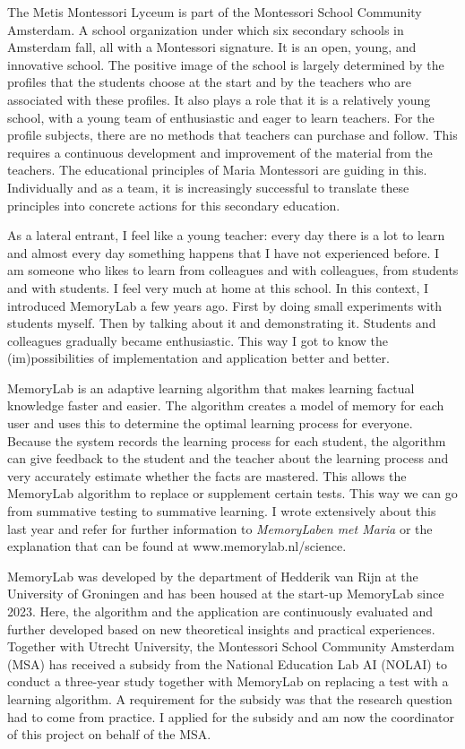 \documentclass[12pt, a4paper]{article}
\begin{document}
The Metis Montessori Lyceum is part of the Montessori School Community Amsterdam. A school organization under which six secondary schools in Amsterdam fall, all with a Montessori signature. It is an open, young, and innovative school. The positive image of the school is largely determined by the profiles that the students choose at the start and by the teachers who are associated with these profiles. It also plays a role that it is a relatively young school, with a young team of enthusiastic and eager to learn teachers. For the profile subjects, there are no methods that teachers can purchase and follow. This requires a continuous development and improvement of the material from the teachers. The educational principles of Maria Montessori are guiding in this. Individually and as a team, it is increasingly successful to translate these principles into concrete actions for this secondary education.

As a lateral entrant, I feel like a young teacher: every day there is a lot to learn and almost every day something happens that I have not experienced before. I am someone who likes to learn from colleagues and with colleagues, from students and with students. I feel very much at home at this school. In this context, I introduced MemoryLab a few years ago. First by doing small experiments with students myself. Then by talking about it and demonstrating it. Students and colleagues gradually became enthusiastic. This way I got to know the (im)possibilities of implementation and application better and better.

MemoryLab is an adaptive learning algorithm that makes learning factual knowledge faster and easier. The algorithm creates a model of memory for each user and uses this to determine the optimal learning process for everyone. Because the system records the learning process for each student, the algorithm can give feedback to the student and the teacher about the learning process and very accurately estimate whether the facts are mastered. This allows the MemoryLab algorithm to replace or supplement certain tests. This way we can go from summative testing to summative learning. I wrote extensively about this last year and refer for further information to \emph{MemoryLaben met Maria} \cite[]{Marijn23} or the explanation that can be found at www.memorylab.nl/science.

MemoryLab was developed by the department of Hedderik van Rijn at the University of Groningen and has been housed at the start-up MemoryLab since 2023. Here, the algorithm and the application are continuously evaluated and further developed based on new theoretical insights and practical experiences. Together with Utrecht University, the Montessori School Community Amsterdam (MSA) has received a subsidy from the National Education Lab AI (NOLAI) to conduct a three-year study together with MemoryLab on replacing a test with a learning algorithm. A requirement for the subsidy was that the research question had to come from practice. I applied for the subsidy and am now the coordinator of this project on behalf of the MSA.
\end{document}
